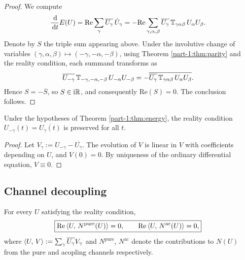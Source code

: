 \begin{proof}
We compute
\begin{equation*}
\frac{\,\mathrm{d}}{\,\mathrm{d} t} E(U) 
= \mathrm{Re}\sum_\gamma \overline{U_\gamma}\,\dot U_\gamma
= -\mathrm{Re}\sum_{\gamma,\alpha,\beta} 
\overline{U_\gamma}\,\mathbb{T}_{\gamma\alpha\beta}\, U_\alpha U_\beta.
\end{equation*}
Denote by $S$ the triple sum appearing above. Under the 
involutive change of variables $(\gamma,\alpha,\beta)\mapsto(-\gamma,-\alpha,-\beta)$, 
using Theorem \ref{part-1:thm:parity} and the reality condition, each 
summand transforms as
\begin{equation*}
\overline{U_{-\gamma}}\,\mathbb{T}_{-\gamma,-\alpha,-\beta}\,U_{-\alpha} U_{-\beta}
= -\overline{\overline{U_\gamma}\,\mathbb{T}_{\gamma\alpha\beta}\,U_\alpha U_\beta}.
\end{equation*}
Hence $S = -\overline{S}$, so $S\in \mathrm{i}\mathbb{R}$, and consequently 
$\mathrm{Re}(S) = 0$. The conclusion follows.
\end{proof}

\begin{corollary}\label{part-1:cor:reality}
Under the hypotheses of Theorem \ref{part-1:thm:energy}, the reality condition 
$U_{-\gamma}(t) = \overline{U_\gamma(t)}$ is preserved for all $t$.
\end{corollary}

\begin{proof}
Let $V_\gamma := U_{-\gamma} - \overline{U_\gamma}$. The evolution of 
$V$ is linear in $V$ with coefficients depending on $U$, and $V(0) = 0$. 
By uniqueness of the ordinary differential equation, $V\equiv 0$.
\end{proof}

\subsection{Channel decoupling}
\label{part-1:ssec:decoupling}

\begin{theorem}\label{part-1:thm:decoupling}
For every $U$ satisfying the reality condition,
\begin{equation}\label{part-1:eq:decoupling}
\boxed{
\mathrm{Re}\left\langle U,\, N^{\mathrm{pure}}(U) \right\rangle = 0,
\qquad
\mathrm{Re}\left\langle U,\, N^{\mathrm{ac}}(U) \right\rangle = 0,
}
\end{equation}
where $\left\langle U,\, V \right\rangle := \sum_\gamma \overline{U_\gamma} V_\gamma$ and
$N^{\mathrm{pure}}$, $N^{\mathrm{ac}}$ denote the contributions to 
$N(U)$ from the pure and acopling channels respectively.
\end{theorem}

